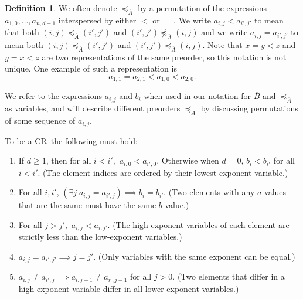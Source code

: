 \documentclass[10pt,a4paper]{article}
\newcommand{\crulenospace}{CR}
\newcommand{\crule}{\crulenospace~}
\newcommand{\xleq}{\preceq_{\overline{A}}}
\newcommand{\assny}{\overline{B}}
\newcommand{\numpoints}{n}
\newcommand{\inumpoints}{i}
\newcommand{\idegr}{j}
\newcommand{\commonconst}{a}
\newcommand{\rareconst}{b}
\theoremstyle{plain}
\theoremstyle{definition}
\newtheorem{definition}[theorem]{Definition}
\begin{document}
\begin{definition}
We often denote $\xleq$ by a permutation of the expressions $\commonconst_{1,0}, \dots, \commonconst_{\numpoints,d-1}$ interspersed by either $<$ or $=$. We write $\commonconst_{\inumpoints,\idegr} < \commonconst_{\inumpoints',\idegr'}$ to mean that both $(\inumpoints,\idegr) 
\xleq (\inumpoints',\idegr')$ and $(\inumpoints',\idegr') 
\not \xleq (\inumpoints,\idegr)$ and we write $\commonconst_{\inumpoints,\idegr} = \commonconst_{\inumpoints',\idegr'}$ to mean both $(\inumpoints,\idegr) 
\xleq (\inumpoints',\idegr')$ and $(\inumpoints',\idegr') 
\xleq (\inumpoints,\idegr)$. Note that $x = y < z$ and $y = x < z$ are two representations of the same preorder, so this notation is not unique. One example of such a representation is $$
\commonconst_{1, 1} = \commonconst_{2, 1} < \commonconst_{1 ,0} < \commonconst_{2 ,0}.
$$

We refer to the expressions $\commonconst_{\inumpoints,\idegr}$ and $\rareconst_\inumpoints$ when used in our notation for $\assny$ and $\xleq$ as variables, and will describe different preorders $\xleq$ by discussing permutations of some sequence of $\commonconst_{\inumpoints,\idegr}$.

To be a \crule the following must hold:

\begin{enumerate}
    \item \label{cr:index-ordering} If $d \geq 1$, then for all $\inumpoints < \inumpoints',$ $\commonconst_{\inumpoints, 0} < \commonconst_{\inumpoints' ,0}.$ Otherwise when $d = 0$, $\rareconst_{\inumpoints} < \rareconst_{\inumpoints'}$ for all $\inumpoints<\inumpoints'$. (The element indices are ordered by their lowest-exponent variable.) 
    \item \label{cr:y-distinct} For all $\inumpoints,\inumpoints'$, $(\exists \idegr\; \commonconst_{\inumpoints,\idegr} = \commonconst_{\inumpoints',\idegr})\implies \rareconst_{\inumpoints} = \rareconst_{\inumpoints'}$. (Two elements with any $\commonconst$ values that are the same must have the same $\rareconst$ value.)
    \item \label{cr:high-first} For all $\idegr > \idegr',$ $\commonconst_{\inumpoints, \idegr} < \commonconst_{\inumpoints, \idegr'}$. (The high-exponent variables of each element are strictly less than the low-exponent variables.)
    \item \label{cr:term-dim-diff} $\commonconst_{\inumpoints, \idegr} = \commonconst_{\inumpoints', \idegr'} \implies \idegr = \idegr'$. (Only variables with the same exponent can be equal.)
    \item \label{cr:high-split} $\commonconst_{\inumpoints, \idegr} \neq \commonconst_{\inumpoints', \idegr} \implies \commonconst_{\inumpoints,\idegr-1} \neq \commonconst_{\inumpoints',\idegr-1}$ for all $\idegr>0$. (Two elements that differ in a high-exponent variable differ in all lower-exponent variables.)
\end{enumerate}


\end{definition}
\end{document}
